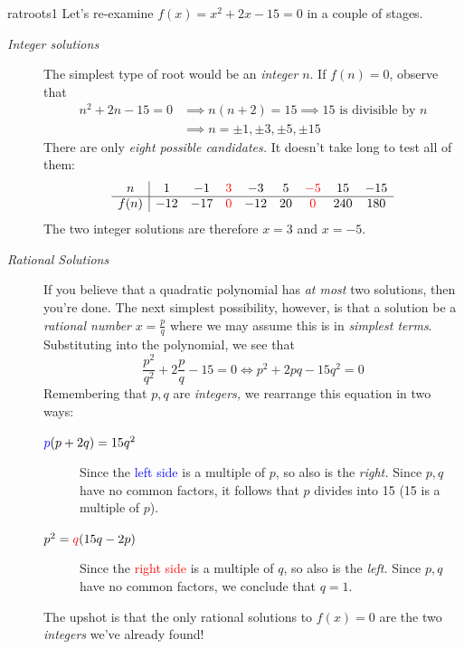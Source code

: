 \begin{example}{}{ratroots1}
	Let's re-examine $f(x)=x^2+2x-15=0$ in a couple of stages.
	\begin{description}
		\item[\normalfont\emph{Integer solutions}] The simplest type of root would be an \emph{integer} $n$. If $f(n)=0$, observe that
		\begin{align*}
			n^2+2n-15=0&\implies n(n+2)=15\implies \text{15 is divisible by $n$}\\
			&\implies n=\pm 1,\pm 3,\pm 5,\pm 15
		\end{align*}
		There are only \emph{eight possible candidates.} It doesn't take long to test all of them:
		\[
			\begin{array}{c|cccccccc}
				n&1&-1&\textcolor{red}{3}&-3&5&\textcolor{red}{-5}&15&-15\\\hline
				f(n)&-12&-17&\textcolor{red}{0}&-12&20&\textcolor{red}{0}&240&180
			\end{array}
		\]
		The two integer solutions are therefore $x=3$ and $x=-5$.
		\item[\normalfont\emph{Rational Solutions}] If you believe that a quadratic polynomial has \emph{at most} two solutions, then you're done. The next simplest possibility, however, is that a solution be a \emph{rational number} $x=\frac pq$ where we may assume this is in \emph{simplest terms}.\footnotemark{} Substituting into the polynomial, we see that
		\[
			\frac{p^2}{q^2}+2\frac pq-15=0\iff p^2+2pq-15q^2=0
		\]
		Remembering that $p,q$ are \emph{integers,} we rearrange this equation in two ways:
		\begin{description}
		  \item[$\textcolor{blue}{p}(p+2q)=15q^2$]\lstsp Since the \textcolor{blue}{left side} is a multiple of $p$, so also is the \emph{right.} Since $p,q$ have no common factors, it follows that $p$ divides into 15 (15 is a multiple of $p$).
		  \item[$p^2=\textcolor{red}{q}(15q-2p)$]\lstsp Since the \textcolor{red}{right side} is a multiple of $q$, so also is the \emph{left.} Since $p,q$ have no common factors, we conclude that $q=1$.
		\end{description}
		The upshot is that the only rational solutions to $f(x)=0$ are the two \emph{integers} we've already found!
	\end{description}
\end{example}


